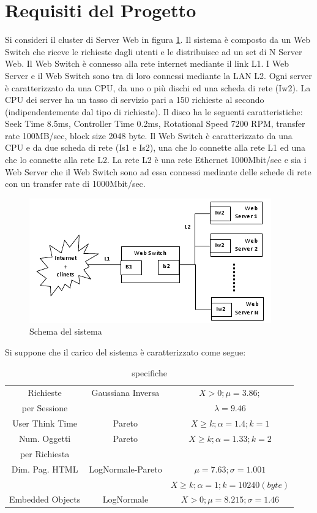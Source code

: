\section{Requisiti del Progetto}
Si consideri il cluster di Server Web in figura \ref{schema1}. Il sistema è composto da un Web Switch che riceve le richieste dagli utenti e le distribuisce ad un set di N Server Web. Il Web Switch è connesso alla rete internet mediante il link L1. I Web Server e il Web Switch sono tra di loro connessi mediante la LAN L2. 
Ogni server è caratterizzato da una CPU, da uno o più dischi ed una scheda di rete (Iw2). La CPU dei server ha un tasso di servizio pari a 150 richieste al secondo (indipendentemente dal tipo di richieste). Il disco ha le seguenti caratteristiche: Seek Time 8.5ms, Controller Time 0.2ms, Rotational Speed 7200 RPM, transfer rate 100MB/sec, block size 2048 byte. 
Il Web Switch è caratterizzato da una CPU e da due scheda di rete (Is1 e Is2), una che lo connette alla rete L1 ed una che lo connette alla rete L2. 
La rete L2 è una rete Ethernet 1000Mbit/sec e sia i Web Server che il Web Switch sono ad essa connessi mediante delle schede di rete con un transfer rate di 1000Mbit/sec. 
\begin{figure}[H]
\begin{center}
\includegraphics[scale=1.2]{etc/schema1.png}
\caption{Schema del sistema}
\label{schema1}
\end{center}
\end{figure}
Si suppone che il carico del sistema è caratterizzato come segue:
\begin{table}[H]
\begin{center}
\begin{tabular}{||c|c|c||}
\hline
Richieste 	&Gaussiana Inversa			&$X > 0; \mu = 3.86;$\\
per Sessione & 							&$\lambda = 9.46$\\
\hline
User Think Time				&Pareto		&$X \geq k; \alpha=1.4; k = 1$\\
\hline
Num. Oggetti 	&Pareto		&$X \geq k; \alpha=1.33; k = 2$\\
per Richiesta	&			&\\							
\hline
Dim. Pag. HTML	&LogNormale-Pareto	&$\mu = 7.63; \sigma = 1.001$ \\
					&					&$X \geq k; \alpha=1; k = 10240 (byte)$\\
\hline
Embedded Objects	&LogNormale			&$X > 0; \mu = 8.215; \sigma = 1.46$\\
\hline
\end{tabular}
\end{center}
\caption{specifiche}
\label{test_1}
\end{table}
